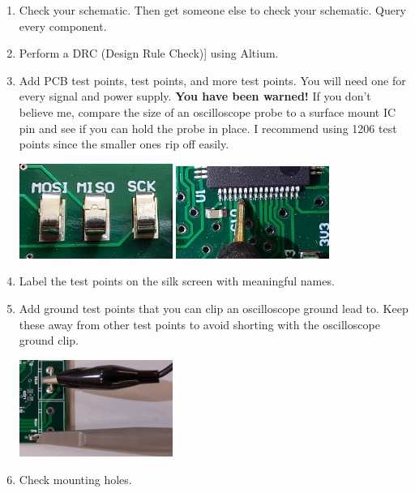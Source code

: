 \begin{enumerate}
\item Check your schematic.  Then get someone else to check your
  schematic.  Query every component.

\item Perform a DRC (Design Rule Check)] using Altium.

\item Add PCB test points, test points, and more test points.  You
  will need one for every signal and power supply.  \textbf{You have
    been warned!}  If you don't believe me, compare the size of an
  oscilloscope probe to a surface mount IC pin and see if you can hold
  the probe in place.  I recommend using 1206 test points since the
  smaller ones rip off easily.

  \includegraphics[width=5cm]{../guide/figs/testpoints.jpg}  \includegraphics[width=5cm]{../guide/figs/micro_probe_zoom.jpg}

\item Label the test points on the silk screen with meaningful names.

\item Add ground test points that you can clip an oscilloscope ground
  lead to.  Keep these away from other test points to avoid shorting
  with the oscilloscope ground clip.

\includegraphics[width=5cm]{figs/scope_probe_testpoints.jpg}

\item Check mounting holes.


\end{enumerate}
